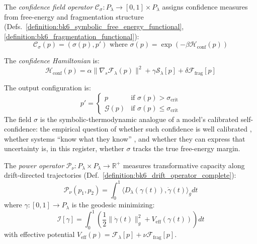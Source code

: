\begin{definition}
\label{definition:bk6_confidence_field_operator}
The \emph{confidence field operator} $\mathcal{C}_\sigma : P_\lambda \to [0,1] \times P_\lambda$ assigns confidence measures from free-energy and fragmentation structure (Defs.~\ref{definition:bk6_symbolic_free_energy_functional}, \ref{definition:bk6_fragmentation_functional}):
\begin{equation}
\mathcal{C}_\sigma(p) = (\sigma(p), p') \text{ where } \sigma(p) = \exp(-\beta \mathcal{H}_{\text{conf}}(p))
\end{equation}

The \emph{confidence Hamiltonian} is:
\begin{equation}
\mathcal{H}_{\text{conf}}(p) = \alpha \|\nabla_s \mathcal{F}_\lambda(p)\|^2 + \gamma \mathcal{S}_\lambda[p] + \delta \mathcal{F}_{\text{frag}}[p]
\end{equation}

The output configuration is:
\begin{equation}
p' = \begin{cases}
p & \text{if } \sigma(p) > \sigma_{\text{crit}} \\
\mathcal{G}(p) & \text{if } \sigma(p) \leq \sigma_{\text{crit}}
\end{cases}
\end{equation}
The field $\sigma$ is the symbolic-thermodynamic analogue of a model's calibrated self-confidence: the empirical question of whether such confidence is well calibrated \citep{guo2017calibration}, whether systems ``know what they know'' \citep{kadavath2022language}, and whether they can express that uncertainty \citep{xiong2024llms,lin2022teaching} is, in this register, whether $\sigma$ tracks the true free-energy margin.
\end{definition}

\begin{definition}
\label{definition:bk6_power_operator}
The \emph{power operator} $\mathcal{P}_\nu : P_\lambda \times P_\lambda \to \mathbb{R}^+$ measures transformative capacity along drift-directed trajectories (Def.~\ref{definition:bk6_drift_operator_complete}):
\begin{equation}
\mathcal{P}_\nu(p_1, p_2) = \int_0^1 \langle D_\lambda(\gamma(t)), \dot{\gamma}(t) \rangle_g dt
\end{equation}
where $\gamma: [0,1] \to P_\lambda$ is the geodesic minimizing:
\begin{equation}
\mathcal{I}[\gamma] = \int_0^1 \left( \frac{1}{2}\|\dot{\gamma}(t)\|_g^2 + V_{\text{eff}}(\gamma(t)) \right) dt
\end{equation}
with effective potential $V_{\text{eff}}(p) = \mathcal{F}_\lambda[p] + \nu \mathcal{F}_{\text{frag}}[p]$.
\end{definition}

